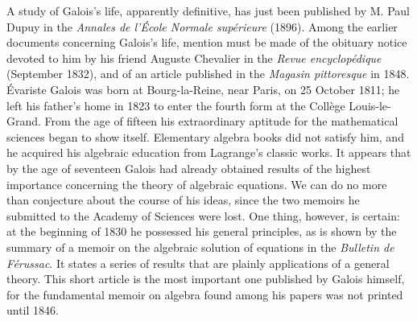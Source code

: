A study of Galois's life, apparently definitive, has just been published by
M. Paul Dupuy in the \emph{Annales de l'École Normale supérieure} (1896).
Among the earlier documents concerning Galois's life, mention must be made of
the obituary notice devoted to him by his friend Auguste Chevalier in the
\emph{Revue encyclopédique} (September 1832), and of an article published in
the \emph{Magasin pittoresque} in 1848. Évariste Galois was born at
Bourg-la-Reine, near Paris, on 25 October 1811; he left his father's home in
1823 to enter the fourth form at the Collège Louis-le-Grand. From the age of
fifteen his extraordinary aptitude for the mathematical sciences began to
show itself. Elementary algebra books did not satisfy him, and he acquired
his algebraic education from Lagrange's classic works. It appears that by the
age of seventeen Galois had already obtained results of the highest importance
concerning the theory of algebraic equations. We can do no more than%
%
conjecture about the course of his ideas, since the two memoirs he submitted
to the Academy of Sciences were lost. One thing, however, is certain: at the
beginning of 1830 he possessed his general principles, as is shown by the
summary of a memoir on the algebraic solution of equations in the
\emph{Bulletin de Férussac}. It states a series of results that are plainly
applications of a general theory. This short article is the most important
one published by Galois himself, for the fundamental memoir on algebra found
among his papers was not printed until 1846.

